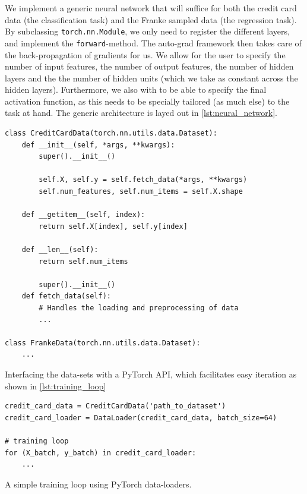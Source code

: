 \documentclass[a4paper, oneside, article]{memoir}
\begin{document}
	We implement a generic neural network that will suffice for both the
	credit card data (the classification task) and the Franke sampled data
	(the regression task). By subclassing \texttt{torch.nn.Module}, we only
	need to register the different layers, and implement the
	\texttt{forward}-method. The auto-grad framework then takes care of the
	back-propagation of gradients for us. We allow for the user to specify
	the number of input features, the number of output features, the number
	of hidden layers and the the number of hidden units (which we take as
	constant across the hidden layers). Furthermore, we also with to be
	able to specify the final activation function, as this needs to be
	specially tailored (as much else) to the task at hand. The generic architecture is layed out in
	\cref{lst:neural_network}.
	
	\begin{listing}
	\begin{verbatim}
class CreditCardData(torch.nn.utils.data.Dataset):
	def __init__(self, *args, **kwargs):
		super().__init__()
		
		self.X, self.y = self.fetch_data(*args, **kwargs)
		self.num_features, self.num_items = self.X.shape

	def __getitem__(self, index):
		return self.X[index], self.y[index]

	def __len__(self):
		return self.num_items

		super().__init__()	
	def fetch_data(self):
		# Handles the loading and preprocessing of data
		...

class FrankeData(torch.nn.utils.data.Dataset):
	...
	\end{verbatim}
	\caption{Interfacing the data-sets with a PyTorch API, which facilitates easy iteration as shown in \cref{lst:training_loop}}
	\label{lst:datasets}
	\end{listing}
	
	\begin{listing}
	\begin{verbatim}
credit_card_data = CreditCardData('path_to_dataset')
credit_card_loader = DataLoader(credit_card_data, batch_size=64)

# training loop
for (X_batch, y_batch) in credit_card_loader:
	...
	\end{verbatim}
	\caption{A simple training loop using PyTorch data-loaders.}
	\label{lst:training_loop}
	\end{listing}
\end{document}
